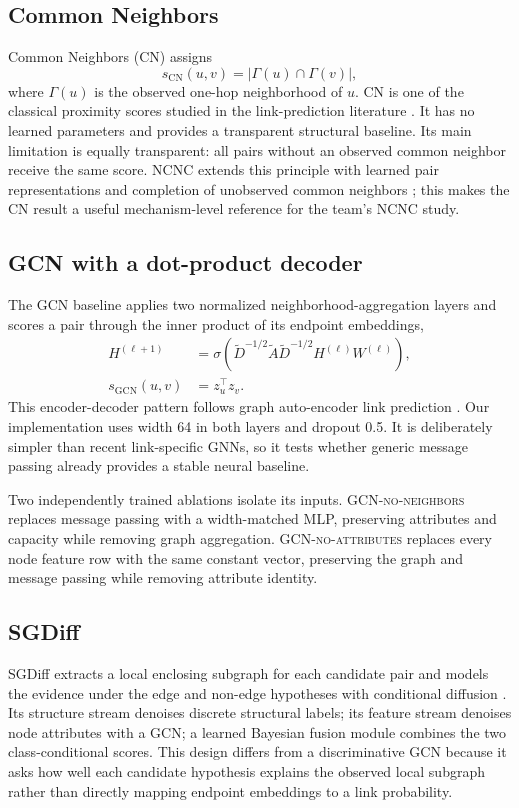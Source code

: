 \documentclass[11pt]{article}
\newcommand{\method}[1]{\textsc{#1}}
\begin{document}
\subsection{Common Neighbors}
Common Neighbors (CN) assigns
\begin{equation}
  s_{\mathrm{CN}}(u,v)=|\Gamma(u)\cap\Gamma(v)|,
\end{equation}
where $\Gamma(u)$ is the observed one-hop neighborhood of $u$. CN is one of
the classical proximity scores studied in the link-prediction literature
\citep{libennowell2007link}. It has no learned parameters and provides a
transparent structural baseline. Its main limitation is equally transparent:
all pairs without an observed common neighbor receive the same score. NCNC
extends this principle with learned pair representations and completion of
unobserved common neighbors \citep{wang2024ncnc}; this makes the CN result a
useful mechanism-level reference for the team's NCNC study.

\subsection{GCN with a dot-product decoder}
The GCN baseline applies two normalized neighborhood-aggregation layers
\citep{kipf2017gcn} and scores a pair through the inner product of its endpoint
embeddings,
\begin{align}
  H^{(\ell+1)} &= \sigma\!\left(\widetilde D^{-1/2}
  \widetilde A\widetilde D^{-1/2}H^{(\ell)}W^{(\ell)}\right),\\
  s_{\mathrm{GCN}}(u,v) &= z_u^\top z_v.
\end{align}
This encoder-decoder pattern follows graph auto-encoder link prediction
\citep{kipf2016vgae}. Our implementation uses width 64 in both layers and
dropout 0.5. It is deliberately simpler than recent link-specific GNNs, so it
tests whether generic message passing already provides a stable neural
baseline.

Two independently trained ablations isolate its inputs. \method{GCN-no-neighbors}
replaces message passing with a width-matched MLP, preserving attributes and
capacity while removing graph aggregation. \method{GCN-no-attributes}
replaces every node feature row with the same constant vector, preserving the
graph and message passing while removing attribute identity.

\subsection{SGDiff}
SGDiff extracts a local enclosing subgraph for each candidate pair and models
the evidence under the edge and non-edge hypotheses with conditional diffusion
\citep{li2025sgdiff}. Its structure stream denoises discrete structural labels;
its feature stream denoises node attributes with a GCN; a learned Bayesian
fusion module combines the two class-conditional scores. This design differs
from a discriminative GCN because it asks how well each candidate hypothesis
explains the observed local subgraph rather than directly mapping endpoint
embeddings to a link probability.
\end{document}
